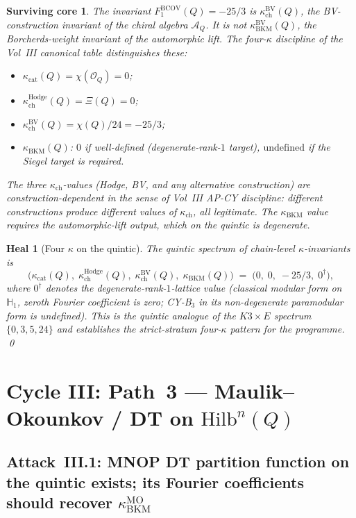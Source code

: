 \documentclass[11pt]{amsart}
\newtheorem{surviving}[theorem]{Surviving core}
\newtheorem{heal}[theorem]{Heal}
\providecommand{\cA}{\mathcal{A}}
\providecommand{\cO}{\mathcal{O}}
\providecommand{\BV}{\mathrm{BV}}
\providecommand{\MO}{\mathrm{MO}}
\providecommand{\kBKM}{\kappa_{\mathrm{BKM}}}
\providecommand{\kch}{\kappa_{\mathrm{ch}}}
\providecommand{\kcat}{\kappa_{\mathrm{cat}}}
\providecommand{\Hdg}{\mathrm{Hodge}}
\providecommand{\Hilb}{\mathrm{Hilb}}
\begin{document}
\begin{surviving}
\label{surv:f1-is-kch-not-kbkm}
The invariant $F_1^{\mathrm{BCOV}}(Q) = -25/3$ is $\kch^{\BV}(Q)$,
the BV-construction invariant of the chiral algebra $\cA_Q$. It is
\emph{not} $\kBKM^{\BV}(Q)$, the Borcherds-weight invariant of the
automorphic lift. The four-$\kappa$ discipline of the Vol~III
canonical table distinguishes these:
\begin{itemize}
\item $\kcat(Q) = \chi(\cO_Q) = 0$;
\item $\kch^{\Hdg}(Q) = \Xi(Q) = 0$;
\item $\kch^{\BV}(Q) = \chi(Q)/24 = -25/3$;
\item $\kBKM(Q)$: $0$ if well-defined (degenerate-rank-$1$ target),
$\text{undefined}$ if the Siegel target is required.
\end{itemize}
The three $\kch$-values (Hodge, BV, and any alternative
construction) are \emph{construction-dependent} in the sense of
Vol~III AP-CY discipline: different constructions produce
different values of $\kappa_{\mathrm{ch}}$, all legitimate.
The $\kBKM$ value requires the automorphic-lift output, which on
the quintic is degenerate.
\end{surviving}

\begin{heal}[Four $\kappa$ on the quintic]
\label{heal:four-kappa-quintic}
The quintic spectrum of chain-level $\kappa$-invariants is
\[
\bigl(\kcat(Q),\; \kch^{\Hdg}(Q),\; \kch^{\BV}(Q),\; \kBKM(Q)\bigr)
\;=\; \bigl(0,\; 0,\; -25/3,\; 0^{\dagger}\bigr),
\]
where $0^{\dagger}$ denotes the degenerate-rank-$1$-lattice value
(classical modular form on $\mathbb{H}_1$, zeroth Fourier coefficient
is zero; CY-B$_3$ in its non-degenerate paramodular form is
undefined). This is the quintic analogue of the
$K3 \times E$ spectrum $\{0, 3, 5, 24\}$ and establishes the
\emph{strict-stratum four-$\kappa$ pattern} for the programme.
\qed
\end{heal}

\section{Cycle III: Path~3 --- Maulik--Okounkov / DT on $\Hilb^n(Q)$}
\label{sec:cycle-3-mo-quintic}

\subsection{Attack~III.1: MNOP DT partition function on the quintic
exists; its Fourier coefficients should recover $\kBKM^{\MO}$}
\end{document}
